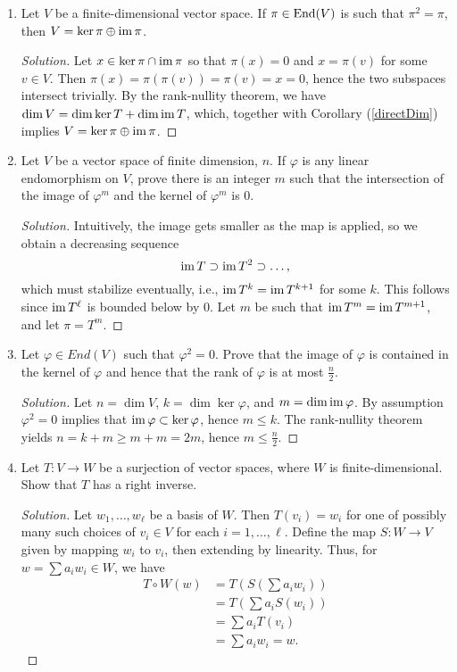 \documentclass[12pt]{article}
\theoremstyle{definition}
\theoremstyle{plain}
\newenvironment{solution}
  {\begin{proof}[Solution]}
  {\end{proof}}
\numberwithin{equation}{section}
\theoremstyle{definition}
\begin{document}
\begin{enumerate}
\item Let $ V $ be a finite-dimensional vector space. If $ \pi \in \operatorname{End}(V) $ is such that $ \pi^2 = \pi $, then $ V = \ker \pi \oplus \operatorname{im} \pi $.

\begin{solution}
Let $ x \in \ker \pi \cap \operatorname{im} \pi $ so that $ \pi (x) = 0 $ and $ x = \pi(v) $ for some $ v \in V $. Then $ \pi (x) = \pi (\pi(v)) = \pi(v) = x = 0 $, hence the two subspaces intersect trivially. By the rank-nullity theorem, we have $ \dim V = \dim \ker T + \dim \operatorname{im} T $, which, together with Corollary (\ref{directDim}) implies $ V = \ker \pi \oplus \operatorname{im} \pi $.
\end{solution}

\item Let $ V $ be a vector space of finite dimension, $ n $. If $ \varphi $ is any linear endomorphism on $ V $, prove there is an integer $ m $ such that the intersection of the image of $ \varphi^m $ and the kernel of $ \varphi^m $ is $ 0 $.

\begin{solution}
Intuitively, the image gets smaller as the map is applied, so we obtain a decreasing sequence
\[ \operatorname{im} T \supset \operatorname{im} T^2 \supset \ldots, \]
which must stabilize eventually, i.e., $ \operatorname{im} T^k = \operatorname{im} T^{k+1} $ for some $ k $. This follows since $ \operatorname{im} T^\ell $ is bounded below by $ 0 $. Let $ m $ be such that $ \operatorname{im} T^m = \operatorname{im} T^{m+1} $, and let $ \pi = T^m $. 	
\end{solution}

\item Let $ \varphi \in End(V) $ such that $ \varphi^2 = 0 $. Prove that the image of $ \varphi $ is contained in the kernel of $ \varphi $ and hence that the rank of $ \varphi $ is at most $ \frac{n}{2} $.

\begin{solution}

Let $ n = \dim V $, $ k = \dim \ker \varphi $, and $ m = \dim \operatorname{im} \varphi $. By assumption $ \varphi^2 = 0 $ implies that $ \operatorname{im} \varphi \subset \ker \varphi $, hence $ m \leq k $. The rank-nullity theorem yields 	$n = k + m \geq m + m = 2m$, hence $ m \leq \frac{n}{2} $.
\end{solution}
 
\item Let $ T : V \to W $ be a surjection of vector spaces, where $ W $ is finite-dimensional. Show that $ T $ has a right inverse.
\begin{solution}
	Let $ w_1, \ldots, w_\ell $ be a basis of $ W $. Then $ T(v_i) = w_i $ for one of possibly many such choices of $ v_i \in V $ for each $ i = 1, \ldots, \ell $. Define the map $ S : W \to V $ given by mapping $ w_i $ to $ v_i $, then extending by linearity. Thus, for $ w = \sum a_i w_i \in W $, we have
	\begin{align*}
		T \circ W(w) &= T(S(\sum a_i w_i))\\
		&= T(\sum a_i S(w_i))\\
		&= \sum a_i T(v_i)\\
		&= \sum a_i w_i = w.
	\end{align*}
\end{solution}


\end{enumerate}
\end{document}
